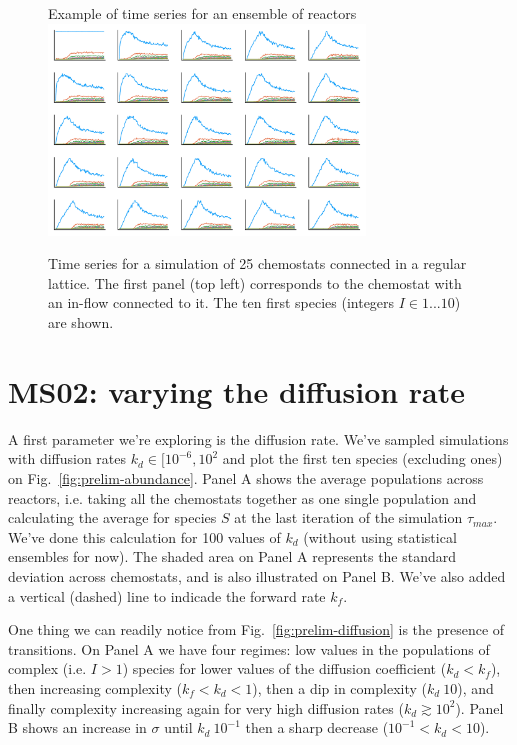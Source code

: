 \documentclass[11pt]{book}
\begin{document}
\begin{figure}[hbt]
  \centering
  {\LARGE Example of time series for an ensemble of reactors}\vspace{1em}\\
  \includegraphics[width=0.75\textwidth]{figures/results/1-prelim/ts-gridplot.pdf}
  \caption{Time series for a simulation of 25 chemostats connected in a regular lattice. The first panel (top left) corresponds to the chemostat with an in-flow connected to it. The ten first species (integers $I\in{1...10}$) are shown.}
  \label{fig:time-series}
\end{figure}

\clearpage

\section{MS02: varying the diffusion rate}

A first parameter we’re exploring is the diffusion rate. We’ve sampled simulations with diffusion rates $k_d\in[10^{-6},10^{2}$ and plot the first ten species (excluding ones) on Fig.~\ref{fig:prelim-abundance}. Panel A shows the average populations across reactors, i.e. taking all the chemostats together as one single population and calculating the average for species $S$ at the last iteration of the simulation $\tau_{max}$. We’ve done this calculation for 100 values of $k_d$ (without using statistical ensembles for now). The shaded area on Panel A represents the standard deviation across chemostats, and is also illustrated on Panel B. We’ve also added a vertical (dashed) line to indicade the forward rate $k_f$. 

One thing we can readily notice from Fig.~\ref{fig:prelim-diffusion} is the presence of transitions. On Panel A we have four regimes: low values in the populations of complex (i.e. $I>1$) species for lower values of the diffusion coefficient ($k_d < k_f$), then increasing complexity ($k_f < k_d < 1$), then a dip in complexity ($k_d ~ 10$), and finally complexity increasing again for very high diffusion rates ($k_d \gtrsim 10^2$). Panel B shows an increase in $\sigma$ until $k_d ~ 10^{-1}$ then a sharp decrease ($10^{-1} < k_d < 10$).
\end{document}

